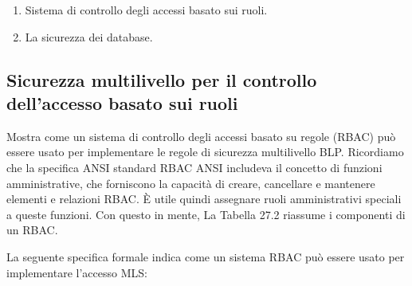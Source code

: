 \begin{enumerate}
    \item Sistema di controllo degli accessi basato sui ruoli.
    
    \item La sicurezza dei database.
\end{enumerate}
\newpage
\subsection{Sicurezza multilivello per il controllo dell'accesso basato sui ruoli}
Mostra come un sistema di controllo degli accessi basato su regole (RBAC) può essere usato per implementare le regole di sicurezza multilivello BLP. Ricordiamo che la specifica ANSI standard RBAC ANSI includeva il concetto di funzioni amministrative, che forniscono la capacità di creare, cancellare e mantenere elementi e relazioni RBAC. È utile quindi assegnare ruoli amministrativi speciali a queste funzioni. Con questo in mente, La Tabella 27.2 riassume i componenti di un RBAC.

\singlespacing

La seguente specifica formale indica come un sistema RBAC può essere usato per implementare l'accesso MLS:

